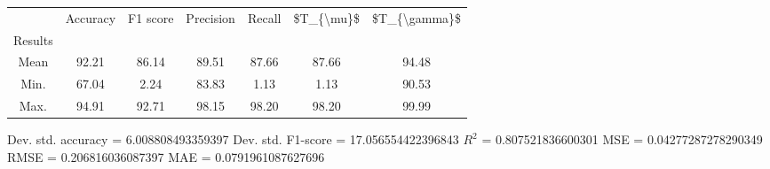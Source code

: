 \begin{tabular}{|c|c|c|c|c|c|c|}
\toprule
{} &  Accuracy &  F1 score &  Precision &  Recall &  \$T\_\{\textbackslash mu\}\$ &  \$T\_\{\textbackslash gamma\}\$ \\
Results &           &           &            &         &            &               \\
\hline
Mean    &     92.21 &     86.14 &      89.51 &   87.66 &      87.66 &         94.48 \\
Min.    &     67.04 &      2.24 &      83.83 &    1.13 &       1.13 &         90.53 \\
Max.    &     94.91 &     92.71 &      98.15 &   98.20 &      98.20 &         99.99 \\
\bottomrule
\end{tabular}

 Dev. std. accuracy = 6.008808493359397
 Dev. std. F1-score = 17.056554422396843
 $R^2$ = 0.807521836600301
 MSE = 0.04277287278290349
 RMSE = 0.206816036087397
 MAE = 0.0791961087627696